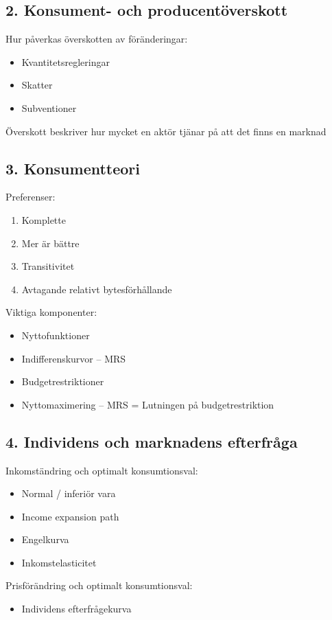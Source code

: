 \documentclass[12pt,a4paper]{article}
\begin{document}
{\subsection*{2. Konsument- och producentöverskott}
Hur påverkas överskotten av föränderingar:
\begin{itemize}
    \item Kvantitetsregleringar
    \item Skatter
    \item Subventioner
\end{itemize}
Överskott beskriver hur mycket en aktör tjänar på att det finns en marknad

\subsection*{3. Konsumentteori}
Preferenser:
\begin{enumerate}
    \item Komplette
    \item Mer är bättre
    \item Transitivitet
    \item Avtagande relativt bytesförhållande
\end{enumerate}
Viktiga komponenter:
\begin{itemize}
    \item Nyttofunktioner
    \item Indifferenskurvor -- MRS
    \item Budgetrestriktioner
    \item Nyttomaximering -- MRS = Lutningen på budgetrestriktion
\end{itemize}

\subsection*{4. Individens och marknadens efterfråga}
Inkomständring och optimalt konsumtionsval:
\begin{itemize}
    \item Normal / inferiör vara
    \item Income expansion path
    \item Engelkurva
    \item Inkomstelasticitet
\end{itemize}

Prisförändring och optimalt konsumtionsval:
\begin{itemize}
    \item Individens efterfrågekurva
\end{itemize}

}
\end{document}
